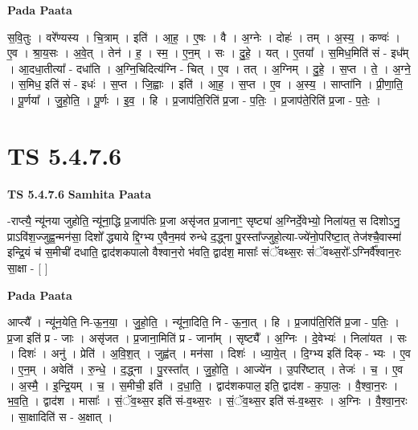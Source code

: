 \documentclass[17pt]{extarticle}
\begin{document}
\textbf{Pada Paata} \newline

स॒वि॒तुः । वरे᳚ण्यस्य । चि॒त्राम् । इति॑ । आ॒ह॒ । ए॒षः । वै । अ॒ग्नेः । दोहः॑ । तम् । अ॒स्य॒ । कण्वः॑ । ए॒व । श्रा॒य॒सः । अ॒वे॒त् । तेन॑ । ह॒ । स्म॒ । ए॒न॒म् । सः । दु॒हे॒ । यत् । ए॒तया᳚ । स॒मिध॒मिति॑ सं - इध᳚म् । आ॒दधा॒तीत्या᳚ - दधा॑ति । अ॒ग्नि॒चिदित्य॑ग्नि - चित् । ए॒व । तत् । अ॒ग्निम् । दु॒हे॒ । स॒प्त । ते॒ । अ॒ग्ने॒ । स॒मिध॒ इति॑ सं - इधः॑ । स॒प्त । जि॒ह्वाः । इति॑ । आ॒ह॒ । स॒प्त । ए॒व । अ॒स्य॒ । साप्ता॑नि । प्री॒णा॒ति॒ । पू॒र्णया᳚ । जु॒हो॒ति॒ । पू॒र्णः । इ॒व॒ । हि । प्र॒जाप॑ति॒रिति॑ प्र॒जा - प॒तिः॒ । प्र॒जाप॑ते॒रिति॑ प्र॒जा - प॒तेः॒ ।  \newline





\section{ TS 5.4.7.6 }

\textbf{TS 5.4.7.6 } \newline
\textbf{Samhita Paata} \newline

-राप्त्यै॒ न्यू॑नया जुहोति॒ न्यू॑ना॒द्धि प्र॒जाप॑तिः प्र॒जा असृ॑जत प्र॒जानाꣳ॒॒ सृष्ट्या॑ अ॒ग्निर्दे॒वेभ्यो॒ निला॑यत॒ स दिशोऽनु॒ प्राऽवि॑श॒ज्जुह्व॒न्मन॑सा॒ दिशो᳚ द्ध्याये द्दि॒ग्भ्य ए॒वैन॒मव॑ रुन्धे द॒द्ध्ना पु॒रस्ता᳚ज्जुहो॒त्या-ज्ये॑नो॒परि॑ष्टा॒त् तेज॑श्चै॒वास्मा॑ इन्द्रि॒यं च॑ स॒मीची॑ दधाति॒ द्वाद॑शकपालो वैश्वान॒रो भ॑वति॒ द्वाद॑श॒ मासाः᳚ संॅवथ्स॒रः सं॑ॅवथ्स॒रो᳚-ऽग्निर्वै᳚श्वान॒रः सा॒क्षा - [  ] \newline

\textbf{Pada Paata} \newline

आप्त्यै᳚ । न्यू॑न॒येति॒ नि-ऊ॒न॒या॒ । जु॒हो॒ति॒ । न्यू॑ना॒दिति॒ नि - ऊ॒ना॒त् । हि । प्र॒जाप॑ति॒रिति॑ प्र॒जा - प॒तिः॒ । प्र॒जा इति॑ प्र - जाः । असृ॑जत । प्र॒जाना॒मिति॑ प्र - जाना᳚म् । सृष्ट्यै᳚ । अ॒ग्निः । दे॒वेभ्यः॑ । निला॑यत । सः । दिशः॑ । अनु॑ । प्रेति॑ । अ॒वि॒श॒त् । जुह्व॑त् । मन॑सा । दिशः॑ । ध्या॒ये॒त् । दि॒ग्भ्य इति॑ दिक् - भ्यः । ए॒व । ए॒न॒म् । अवेति॑ । रु॒न्धे॒ । द॒द्ध्ना । पु॒रस्ता᳚त् । जु॒हो॒ति॒ । आज्ये॑न । उ॒परि॑ष्टात् । तेजः॑ । च॒ । ए॒व । अ॒स्मै॒ । इ॒न्द्रि॒यम् । च॒ । स॒मीची॒ इति॑ । द॒धा॒ति॒ । द्वाद॑शकपाल॒ इति॒ द्वाद॑श - क॒पा॒लः॒ । वै॒श्वा॒न॒रः । भ॒व॒ति॒ । द्वाद॑श । मासाः᳚ । सं॒ॅव॒थ्स॒र इति॑ सं-व॒थ्स॒रः । सं॒ॅव॒थ्स॒र इति॑ सं-व॒थ्स॒रः । अ॒ग्निः । वै॒श्वा॒न॒रः । सा॒क्षादिति॑ स - अ॒क्षात् ।  \newline
\end{document}
